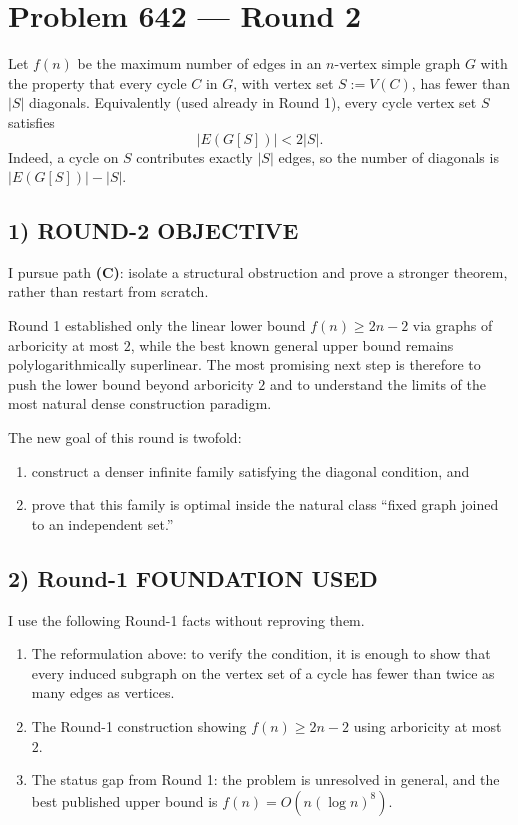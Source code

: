 \section*{Problem 642 --- Round 2}

Let $f(n)$ be the maximum number of edges in an $n$-vertex simple graph $G$ with the property that every cycle $C$ in $G$, with vertex set $S:=V(C)$, has fewer than $|S|$ diagonals. Equivalently (used already in Round 1), every cycle vertex set $S$ satisfies
\[
|E(G[S])|<2|S|.
\]
Indeed, a cycle on $S$ contributes exactly $|S|$ edges, so the number of diagonals is $|E(G[S])|-|S|$.

\subsection*{1) ROUND-2 OBJECTIVE}
I pursue path \textbf{(C)}: isolate a structural obstruction and prove a stronger theorem, rather than restart from scratch.

Round 1 established only the linear lower bound $f(n)\ge 2n-2$ via graphs of arboricity at most $2$, while the best known general upper bound remains polylogarithmically superlinear. The most promising next step is therefore to push the lower bound beyond arboricity $2$ and to understand the limits of the most natural dense construction paradigm.

The new goal of this round is twofold:

\begin{enumerate}
\item construct a denser infinite family satisfying the diagonal condition, and
\item prove that this family is optimal inside the natural class ``fixed graph joined to an independent set.''
\end{enumerate}

\subsection*{2) Round-1 FOUNDATION USED}
I use the following Round-1 facts without reproving them.

\begin{enumerate}
\item The reformulation above: to verify the condition, it is enough to show that every induced subgraph on the vertex set of a cycle has fewer than twice as many edges as vertices.
\item The Round-1 construction showing $f(n)\ge 2n-2$ using arboricity at most $2$.
\item The status gap from Round 1: the problem is unresolved in general, and the best published upper bound is $f(n)=O\!\left(n(\log n)^8\right)$.
\end{enumerate}

